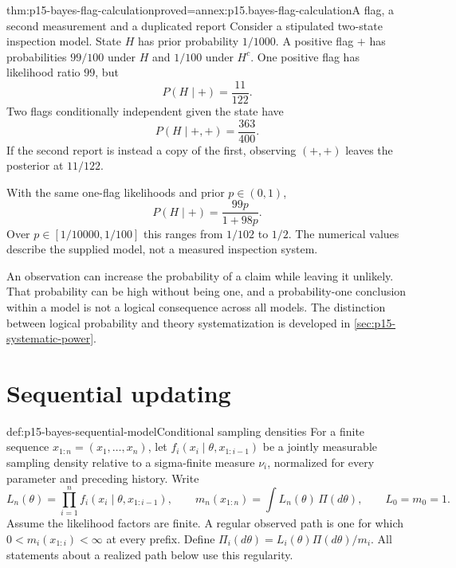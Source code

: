 \begin{hbtheorem}{thm:p15-bayes-flag-calculation}{proved=annex:p15.bayes-flag-calculation}{A flag, a second measurement and a duplicated report}
Consider a stipulated two-state inspection model. State \(H\) has
prior probability \(1/1000\). A positive flag \(+\) has probabilities
\(99/100\) under \(H\) and \(1/100\) under \(H^c\).
One positive flag has likelihood ratio \(99\), but
\[
 P(H\mid +)=\frac{11}{122}.
\]
Two flags conditionally independent given the state have
\[
 P(H\mid +,+)=\frac{363}{400}.
\]
If the second report is instead a copy of the first, observing
\((+,+)\) leaves the posterior at \(11/122\).

With the same one-flag likelihoods and prior \(p\in(0,1)\),
\[
                    P(H\mid +)=\frac{99p}{1+98p}.
\]
Over \(p\in[1/10000,1/100]\) this ranges from \(1/102\) to \(1/2\).
The numerical values describe the supplied model, not a measured
inspection system.
\end{hbtheorem}

An observation can increase the probability of a claim while leaving
it unlikely. That probability can be high without being one, and a
probability-one conclusion within a model is not a logical consequence
across all models. The distinction between logical probability and
theory systematization is developed in
\cref{sec:p15-systematic-power}.

\section{Sequential updating}
\label{sec:p15-bayes-sequential}

\begin{hbdefinition}{def:p15-bayes-sequential-model}{Conditional sampling densities}
For a finite sequence \(x_{1:n}=(x_1,\ldots,x_n)\), let
\(f_i(x_i\mid\theta,x_{1:i-1})\) be a jointly measurable
sampling density relative to a sigma-finite measure \(\nu_i\),
normalized for every parameter and preceding history. Write
\[
 L_n(\theta)=\prod_{i=1}^n f_i(x_i\mid\theta,x_{1:i-1}),
 \qquad m_n(x_{1:n})=\int L_n(\theta)\,\Pi(d\theta),
 \qquad L_0=m_0=1.
\]
Assume the likelihood factors are finite. A regular observed path
is one for which \(0<m_i(x_{1:i})<\infty\) at every prefix.
Define \(\Pi_i(d\theta)=L_i(\theta)\Pi(d\theta)/m_i\).
All statements about a realized path below use this regularity.
\end{hbdefinition}


